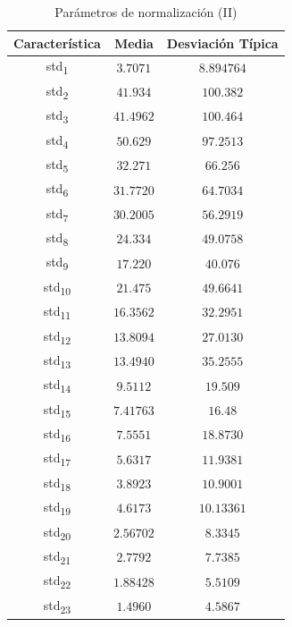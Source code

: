 \documentclass[12pt]{article}
\begin{document}
\begin{table}
	\caption{Parámetros de normalización (II)}
	\centering
		\begin{tabular}{||c c c||}
			\hline
			Característica & Media & Desviación Típica  \\ [0.5ex]
			\hline\hline
			std\textsubscript{1} & $3.7071$ & $8.894764$ \\
			\hline
			std\textsubscript{2} & $41.934$ & $100.382$ \\
			\hline
			std\textsubscript{3} & $41.4962$ & $100.464$ \\
			\hline
			std\textsubscript{4} & $50.629$ & $97.2513$ \\
			\hline
			std\textsubscript{5} & $32.271$ & $66.256$ \\
			\hline
			std\textsubscript{6} & $31.7720$ & $64.7034$ \\
			\hline
			std\textsubscript{7} & $30.2005$ & $56.2919$ \\
			\hline
			std\textsubscript{8} & $24.334$ & $49.0758$ \\
			\hline
			std\textsubscript{9} & $17.220$ & $40.076$ \\
			\hline
			std\textsubscript{10} & $21.475$ & $49.6641$ \\
			\hline
			std\textsubscript{11} & $16.3562$ & $32.2951$ \\
			\hline
			std\textsubscript{12} & $13.8094$ & $27.0130$ \\
			\hline
			std\textsubscript{13} & $13.4940$ & $35.2555$ \\
			\hline
			std\textsubscript{14} & $9.5112$ & $19.509$ \\
			\hline
			std\textsubscript{15} & $7.41763$ & $16.48$ \\
			\hline
			std\textsubscript{16} & $7.5551$ & $18.8730$ \\
			\hline
			std\textsubscript{17} & $5.6317$ & $11.9381$ \\
			\hline
			std\textsubscript{18} & $3.8923$ & $10.9001$ \\
			\hline
			std\textsubscript{19} & $4.6173$ & $10.13361$ \\
			\hline
			std\textsubscript{20} & $2.56702$ & $8.3345$ \\
			\hline
			std\textsubscript{21} & $2.7792$ & $7.7385$ \\
			\hline
			std\textsubscript{22} & $1.88428$ & $5.5109$ \\
			\hline
			std\textsubscript{23} & $1.4960$ & $4.5867$ \\

\end{tabular}
\end{table}
\end{document}
